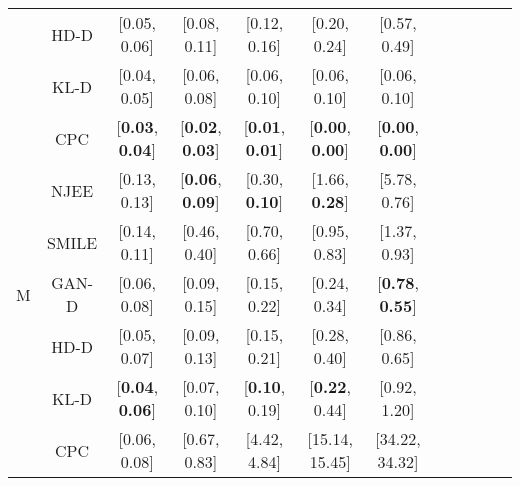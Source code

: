 \begin{table}
\begin{tabular}{ |c|c|c c c c c|c c c c c| }
      & HD-D & [0.05, 0.06] & [0.08, 0.11] & [0.12, 0.16] & [0.20, 0.24] & [0.57, 0.49]  \\
      & KL-D & [0.04, 0.05] & [0.06, 0.08] & [0.06, 0.10] & [0.06, 0.10] & [0.06, 0.10] \\
      & CPC & [\textbf{0.03}, \textbf{0.04}] & [\textbf{0.02}, \textbf{0.03}] & [\textbf{0.01}, \textbf{0.01}] & [\textbf{0.00}, \textbf{0.00}] & [\textbf{0.00}, \textbf{0.00}]  \\
     \hline
     & NJEE & [0.13, 0.13] & [\textbf{0.06}, \textbf{0.09}] & [0.30, \textbf{0.10}] & [1.66, \textbf{0.28}] & [5.78, 0.76]  \\
      & SMILE & [0.14, 0.11] & [0.46, 0.40] & [0.70, 0.66] & [0.95, 0.83] & [1.37, 0.93] \\
      M & GAN-D & [0.06, 0.08] & [0.09, 0.15] & [0.15, 0.22] & [0.24, 0.34] & [\textbf{0.78}, \textbf{0.55}]  \\
      & HD-D & [0.05, 0.07] & [0.09, 0.13] & [0.15, 0.21] & [0.28, 0.40] & [0.86, 0.65]  \\
      & KL-D & [\textbf{0.04}, \textbf{0.06}] & [0.07, 0.10] & [\textbf{0.10}, 0.19] & [\textbf{0.22}, 0.44] & [0.92, 1.20]  \\
      & CPC & [0.06, 0.08] & [0.67, 0.83] & [4.42, 4.84] & [15.14, 15.45] & [34.22, 34.32]  \\
     \hline
    \end{tabular}
    \label{tab:MI_bias_var_mse_gauss_d_varying}
\end{table}

